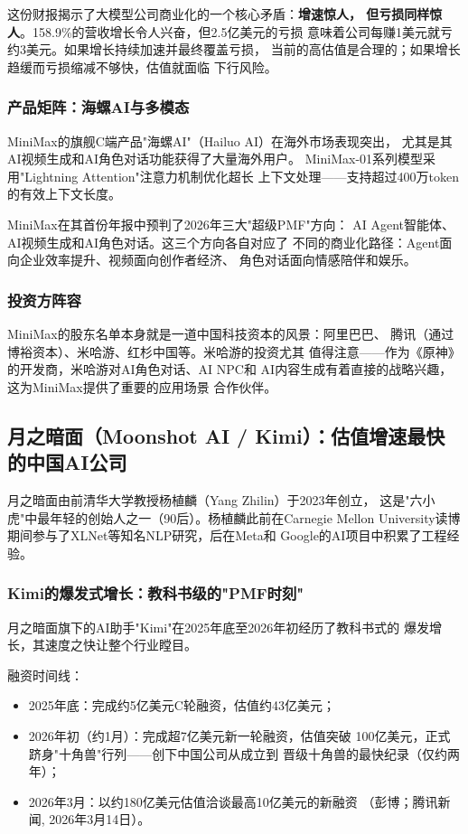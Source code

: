 这份财报揭示了大模型公司商业化的一个核心矛盾：\textbf{增速惊人，
但亏损同样惊人}。158.9\%的营收增长令人兴奋，但2.5亿美元的亏损
意味着公司每赚1美元就亏约3美元。如果增长持续加速并最终覆盖亏损，
当前的高估值是合理的；如果增长趋缓而亏损缩减不够快，估值就面临
下行风险。

\subsubsection{产品矩阵：海螺AI与多模态}
MiniMax的旗舰C端产品"海螺AI"（Hailuo AI）在海外市场表现突出，
尤其是其AI视频生成和AI角色对话功能获得了大量海外用户。
MiniMax-01系列模型采用"Lightning Attention"注意力机制优化超长
上下文处理——支持超过400万token的有效上下文长度。

MiniMax在其首份年报中预判了2026年三大"超级PMF"方向：
AI Agent智能体、AI视频生成和AI角色对话。这三个方向各自对应了
不同的商业化路径：Agent面向企业效率提升、视频面向创作者经济、
角色对话面向情感陪伴和娱乐。

\subsubsection{投资方阵容}
MiniMax的股东名单本身就是一道中国科技资本的风景：阿里巴巴、
腾讯（通过博裕资本）、米哈游、红杉中国等。米哈游的投资尤其
值得注意——作为《原神》的开发商，米哈游对AI角色对话、AI NPC和
AI内容生成有着直接的战略兴趣，这为MiniMax提供了重要的应用场景
合作伙伴。

\subsection{月之暗面（Moonshot AI / Kimi）：估值增速最快的中国AI公司}
\label{subsec:moonshot}

月之暗面由前清华大学教授杨植麟（Yang Zhilin）于2023年创立，
这是"六小虎"中最年轻的创始人之一（90后）。杨植麟此前在Carnegie
Mellon University读博期间参与了XLNet等知名NLP研究，后在Meta和
Google的AI项目中积累了工程经验。

\subsubsection{Kimi的爆发式增长：教科书级的"PMF时刻"}
月之暗面旗下的AI助手"Kimi"在2025年底至2026年初经历了教科书式的
爆发增长，其速度之快让整个行业瞠目。

融资时间线：
\begin{itemize}
  \item 2025年底：完成约5亿美元C轮融资，估值约43亿美元；
  \item 2026年初（约1月）：完成超7亿美元新一轮融资，估值突破
    100亿美元，正式跻身"十角兽"行列——创下中国公司从成立到
    晋级十角兽的最快纪录（仅约两年）；
  \item 2026年3月：以约180亿美元估值洽谈最高10亿美元的新融资
    （彭博；腾讯新闻, 2026年3月14日）。
\end{itemize}

